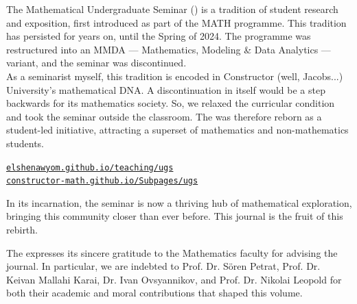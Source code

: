 

  \vspace{0.3cm}

  The Mathematical Undergraduate Seminar (\UgS) is a tradition of student research and exposition,
  first introduced as part of the MATH programme. This tradition has persisted for years on, 
  until the Spring of 2024. The programme was restructured into an MMDA --- Mathematics, Modeling \& Data Analytics --- variant,
  and the seminar was discontinued.\\[0.3cm]
  As a seminarist myself, this tradition is encoded in Constructor (well, Jacobs...) University's mathematical DNA. 
  A discontinuation in itself would be a step backwards for its mathematics society. So, we relaxed the curricular condition and took the
  seminar outside the classroom. The \UgS was therefore reborn as a student-led initiative, attracting a superset of mathematics and non-mathematics students.
  \begin{center}
    \href{https://elshenawyom.github.io/teaching/ugs}{\texttt{elshenawyom.github.io/teaching/ugs}}\\
    \href{https://constructor-math.github.io/Subpages/ugs}{\texttt{constructor-math.github.io/Subpages/ugs}}\\
  \end{center}
  In its incarnation, the seminar is now a thriving hub of mathematical exploration, bringing this community closer than ever before.  
  This journal is the fruit of this rebirth.

  \vspace{0.3cm}


\vspace{0.3cm}

The \SMJ expresses its sincere gratitude to the Mathematics faculty for advising the journal. 
In particular, we are indebted to Prof. Dr. Sören Petrat, Prof. Dr. Keivan Mallahi Karai, 
Dr. Ivan Ovsyannikov, and Prof. Dr. Nikolai Leopold for both their academic and 
moral contributions that shaped this volume.

